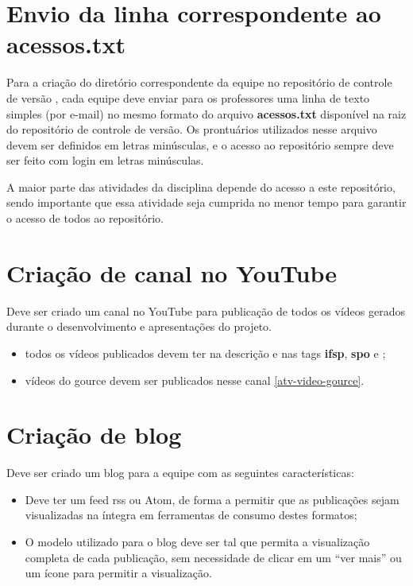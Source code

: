 \section{Envio da linha correspondente ao acessos.txt}\label{atv-acessos}
Para a criação do diretório correspondente da equipe no repositório de controle de versão , cada equipe deve enviar para os professores uma linha de texto simples (por e-mail) no mesmo formato do arquivo \textbf{acessos.txt} disponível na raiz do repositório de controle de versão. Os prontuários utilizados nesse arquivo devem ser definidos em letras minúsculas, e o acesso ao repositório sempre deve ser feito com login em letras minúsculas.

A maior parte das atividades da disciplina depende do acesso a este repositório, sendo importante que essa atividade seja cumprida no menor tempo para garantir o acesso de todos ao repositório.


\section{Criação de canal no YouTube}\label{atv-criacao-youtube}
Deve ser criado um canal no YouTube para publicação de todos os vídeos gerados durante o desenvolvimento e apresentações do projeto.

\begin{itemize}
    \item todos os vídeos publicados devem ter na descrição e nas tags \textbf{\acs{ifsp}}, \textbf{\acs{spo}} e \textbf{\codigoDisciplina};
    
    \item vídeos do \gls{gource} devem ser publicados nesse canal \autoref{atv-video-gource}.
\end{itemize}

\section{Criação de blog}\label{atv-criacao-blog}
Deve ser criado um blog para a equipe com as seguintes características:
\begin{itemize}
    \item Deve ter um feed \acs{rss} ou Atom, de forma a permitir que as publicações sejam visualizadas na íntegra em ferramentas de consumo destes formatos;
    
    \item O modelo utilizado para o blog deve ser tal que permita a visualização completa de cada publicação, sem necessidade de clicar em um \enquote{ver mais} ou um ícone para permitir a visualização.
    
\end{itemize}

